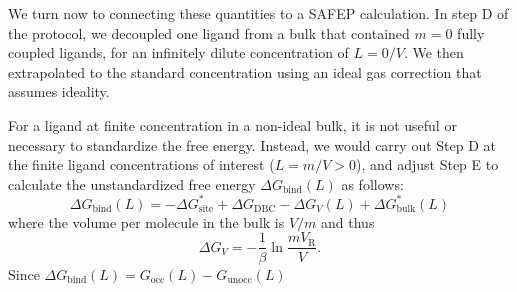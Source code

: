 \documentclass[9pt,tutorial]{Styling/livecoms}
\begin{document}
We turn now to connecting these quantities to a SAFEP calculation.  In step D of the protocol, we decoupled one ligand from a bulk that contained $m=0$ fully coupled ligands, for an infinitely dilute concentration of $L=0/V$. We then extrapolated to the standard concentration using an ideal gas correction that assumes ideality.

For a ligand at finite concentration in a non-ideal bulk, it is not useful or necessary to standardize the free energy. Instead, we would carry out Step D at the finite ligand concentrations of interest ($L=m/V>0$), and adjust Step E to calculate the unstandardized free energy $\Delta G_\mathrm{bind}(L)$ as follows: 
\begin{equation}
\Delta G_\mathrm{bind}(L)= - \Delta G_\mathrm{site}^* + \Delta G_\mathrm{DBC} -\Delta G_V(L)+ \Delta G^*_\mathrm{bulk}(L)
\end{equation} 
where the volume per molecule in the bulk is $V/m$ and thus \begin{equation}
\label{eq:idealGas}
    \Delta G_V= -\frac{1}{\beta} \ln \frac{m V_\mathrm{R}}{V}. 
\end{equation}
Since
    $\Delta G_\mathrm{bind}(L) = G_\mathrm{occ}(L) - G_\mathrm{unocc}(L)$
\end{document}
